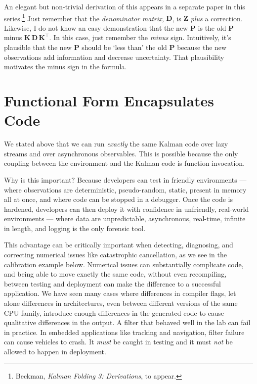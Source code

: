 \documentclass[10pt,oneside,x11names]{article}
\begin{document}
An elegant but non-trivial derivation of this appears in a separate paper in this 
series.\footnote{Beckman, \emph{Kalman Folding 3: Derivations}, to appear.} 
Just remember that the \emph{denominator matrix},
\(\mathbold{D}\), is \(\mathbold{Z}\) \emph{plus} a correction. Likewise, I do not know
an easy demonstration that the new \(\mathbold{P}\) is the old \(\mathbold{P}\)
minus \(\mathbold{K}\,\mathbold{D}\,\mathbold{K}^\intercal\). In this case, just
remember the \emph{minus} sign. Intuitively, it's plausible that the new
\(\mathbold{P}\) should be `less than' the old \(\mathbold{P}\) because the new
observations add information and decrease uncertainty. That plausibility
motivates the minus sign in the formula.

\section{Functional Form Encapsulates Code}
\label{sec:orgheadline21}

We stated above that we can run \emph{exactly} the same Kalman code over lazy streams
and over asynchronous observables. This is possible because the only coupling
between the environment and the Kalman code is function invocation.

Why is this important? Because developers can test in friendly environments ---
where observations are deterministic, pseudo-random, static, present in memory
all at once, and where code can be stopped in a debugger. Once the code is
hardened, developers can then deploy it with confidence in unfriendly,
real-world environments --- where data are unpredictable, asynchronous,
real-time, infinite in length, and logging is the only forensic tool.

This advantage can be critically important when detecting, diagnosing, and
correcting numerical issues like catastrophic cancellation, as we see in the
calibration example below. Numerical issues can substantially complicate code,
and being able to move exactly the same code, without even recompiling, between
testing and deployment can make the difference to a successful application. We
have seen many cases where differences in compiler flags, let alone differences
in architectures, even between different versions of the same CPU family,
introduce enough differences in the generated code to cause qualitative
differences in the output. A filter that behaved well in the lab can fail in practice. In
embedded applications like tracking and navigation, filter failure can cause
vehicles to crash. It \emph{must} be caught in testing and it must \emph{not} be allowed
to happen in deployment.
\end{document}
